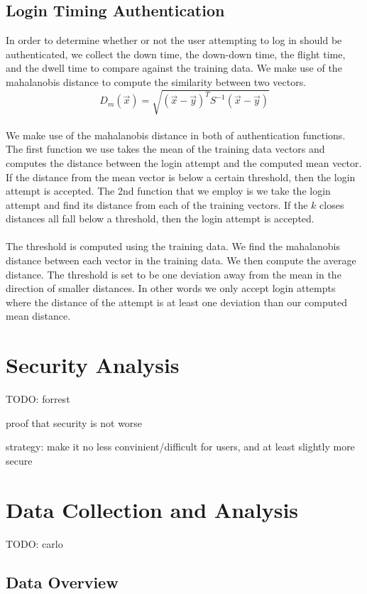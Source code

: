 \documentclass{article}
\begin{document}
\subsection{Login Timing Authentication}
In order to determine whether or not the user attempting to log in should be authenticated, we collect the down time, the down-down time, the flight time, and the dwell time to compare against the training data. We make use of the mahalanobis distance to compute the similarity between two vectors.  \\
\begin{displaymath}
D_m(\vec{x}) = \sqrt{(\vec{x}-\vec{y})^T S^{-1} (\vec{x}-\vec{y})}
\end{displaymath} \\
We make use of the mahalanobis distance in both of authentication functions. The first function we use takes the mean of the training data vectors and computes the distance between the login attempt and the computed mean vector. If the distance from the mean vector is below a certain threshold, then the login attempt is accepted. The 2nd function that we employ is we take the login attempt and find its distance from each of the training vectors. If the $k$ closes distances all fall below a threshold, then the login attempt is accepted. \\ \\
The threshold is computed using the training data. We find the mahalanobis distance between each vector in the training data. We then compute the average distance. The threshold is set to be one deviation away from the mean in the direction of smaller distances. In other words we only accept login attempts where the distance of the attempt is at least one deviation than our computed mean distance. 
\section{Security Analysis}
TODO: forrest

proof that security is not worse

strategy: make it no less convinient/difficult for users, and at least slightly more secure

\section{Data Collection and Analysis}
TODO: carlo

\subsection{Data Overview}
\end{document}
